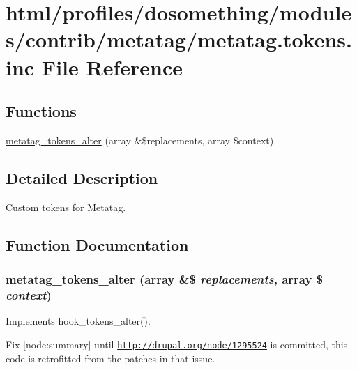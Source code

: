 \hypertarget{metatag_8tokens_8inc}{
\section{html/profiles/dosomething/modules/contrib/metatag/metatag.tokens.inc File Reference}
\label{metatag_8tokens_8inc}
}
\subsection*{Functions}
\begin{DoxyCompactItemize}
\item 
\hyperlink{metatag_8tokens_8inc_aa5a2a1311323a65037cca7e949e7c899}{metatag\_\-tokens\_\-alter} (array \&\$replacements, array \$context)
\end{DoxyCompactItemize}


\subsection{Detailed Description}
Custom tokens for Metatag. 

\subsection{Function Documentation}
\hypertarget{metatag_8tokens_8inc_aa5a2a1311323a65037cca7e949e7c899}{
\subsubsection[{metatag\_\-tokens\_\-alter}]{\setlength{\rightskip}{0pt plus 5cm}metatag\_\-tokens\_\-alter (array \&\$ {\em replacements}, \/  array \$ {\em context})}}
\label{metatag_8tokens_8inc_aa5a2a1311323a65037cca7e949e7c899}
Implements hook\_\-tokens\_\-alter().

Fix \mbox{[}node:summary\mbox{]} until \href{http://drupal.org/node/1295524}{\tt http://drupal.org/node/1295524} is committed, this code is retrofitted from the patches in that issue. 